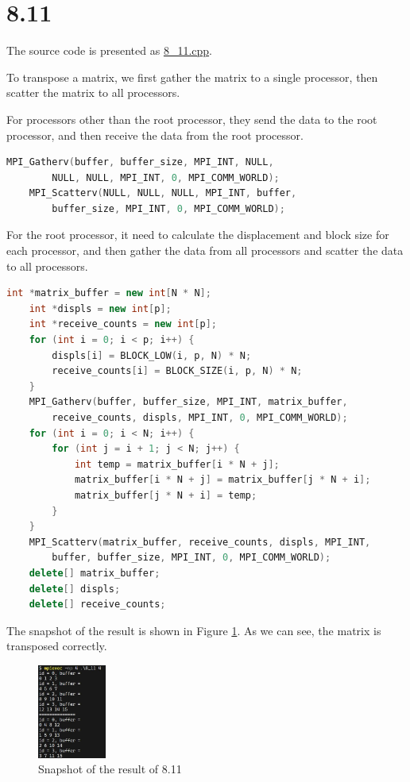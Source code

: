 \section*{8.11}

The source code is presented as \href{run:./8_11.cpp}{8\_11.cpp}.

To transpose a matrix, we first gather the matrix to a single processor, then scatter the matrix to all processors. 

For processors other than the root processor, they send the data to the root processor, and then receive the data from the root processor.

\begin{lstlisting}[language=C++]
    MPI_Gatherv(buffer, buffer_size, MPI_INT, NULL, 
        NULL, NULL, MPI_INT, 0, MPI_COMM_WORLD);
    MPI_Scatterv(NULL, NULL, NULL, MPI_INT, buffer, 
        buffer_size, MPI_INT, 0, MPI_COMM_WORLD);
\end{lstlisting}

For the root processor, it need to calculate the displacement and block size for each processor, and then gather the data from all processors and scatter the data to all processors.

\begin{lstlisting}[language=C++]
    int *matrix_buffer = new int[N * N];
    int *displs = new int[p];
    int *receive_counts = new int[p];
    for (int i = 0; i < p; i++) {
        displs[i] = BLOCK_LOW(i, p, N) * N;
        receive_counts[i] = BLOCK_SIZE(i, p, N) * N;
    }
    MPI_Gatherv(buffer, buffer_size, MPI_INT, matrix_buffer, 
        receive_counts, displs, MPI_INT, 0, MPI_COMM_WORLD);
    for (int i = 0; i < N; i++) {
        for (int j = i + 1; j < N; j++) {
            int temp = matrix_buffer[i * N + j];
            matrix_buffer[i * N + j] = matrix_buffer[j * N + i];
            matrix_buffer[j * N + i] = temp;
        }
    }
    MPI_Scatterv(matrix_buffer, receive_counts, displs, MPI_INT, 
        buffer, buffer_size, MPI_INT, 0, MPI_COMM_WORLD);
    delete[] matrix_buffer;
    delete[] displs;
    delete[] receive_counts;
\end{lstlisting}

The snapshot of the result is shown in Figure \ref{fig:8_11}. As we can see, the matrix is transposed correctly.

\begin{figure}[H]
    \centering
    \includegraphics[width=0.2\textwidth]{fig-8_11.jpg}
    \caption{Snapshot of the result of 8.11}
    \label{fig:8_11}
\end{figure}

